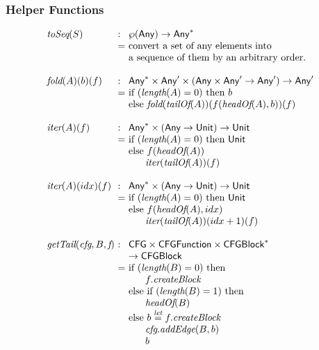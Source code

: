 \subsubsection{Helper Functions}
\[
\begin{array}{l@{}l@{~}l}
\toSeq(S) & : & \powerset{\Any} \rightarrow \Any^{*}\\
& = & \text{convert a set of any elements into}\\
& & \text{a sequence of them by an arbitrary order.}\\
& & \\

\fold(A)(b)(f) & : & \Any^{*} \times \Any' \times (\Any \times \Any' \rightarrow \Any') \rightarrow \Any'\\
& = & \mbox{if}\ (\length(A) = 0)\ \mbox{then}\ b \\
& & \mbox{else}\ \fold(\tailOf(A))(f(\headOf(A),b))(f)\\
& & \\

\iter(A)(f) & : & \Any^{*} \times (\Any \rightarrow \Unit) \rightarrow \Unit\\
& = & \mbox{if}\ (\length(A) = 0)\ \mbox{then}\ \Unit \\
& & \mbox{else}\ f(\headOf(A))\\
& & \phantom{else} \iter(\tailOf(A))(f)\\
& & \\

\iter(A)(idx)(f) & : & \Any^{*} \times (\Any \rightarrow \Unit) \rightarrow \Unit\\
& = & \mbox{if}\ (\length(A) = 0)\ \mbox{then}\ \Unit \\
& & \mbox{else}\ f(\headOf(A), idx)\\
& & \phantom{else} \iter(\tailOf(A))(idx+1)(f)\\
& & \\

\getTail(\emph{cfg}, B, \emph{f})\ & : & \CFG \times \CFGFunction \times \CFGBlock^{*} \\
&&\rightarrow \CFGBlock \\
& = & \mbox{if}\ (\length(B) = 0)\ \mbox{then}\\
& & \phantom{else} f.\emph{createBlock}\\
& & \mbox{else}\ \mbox{if}\ (\length(B) = 1)\ \mbox{then}\\
& & \phantom{else} \headOf(B) \\
& & \mbox{else}\ b \letval f.\emph{createBlock}\\
& & \phantom{else} \emph{cfg}.\emph{addEdge}(B, b)\\
& & \phantom{else} b\\
\end{array}
\]

